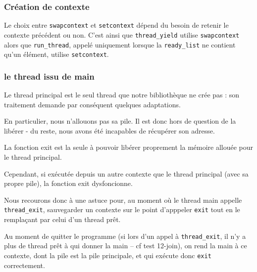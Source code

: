 \subsubsection{Création de contexte}
Le choix entre \texttt{swapcontext} et \texttt{setcontext} dépend du
 besoin de retenir le contexte précédent ou non. C'est ainsi que 
\texttt{thread\_yield} utilise \texttt{swapcontext} alors que 
\texttt{run\_thread}, appelé uniquement lorsque la \texttt{ready\_list}
ne contient qu'un élément, utilise \texttt{setcontext}. 

\subsubsection{le thread issu de main}
Le thread principal est le seul thread que notre bibliothèque ne crée
pas : son traitement demande par conséquent quelques adaptations.

En particulier, nous n'allouons pas sa pile. Il est donc hors de
question de la libérer - du reste, nous avons été incapables de
récupérer son adresse.

La fonction exit est la seule à pouvoir libérer proprement la mémoire
allouée pour le thread principal.

Cependant, si exécutée depuis un autre contexte que le thread principal
(avec sa propre pile), la fonction exit dysfoncionne.

Nous recourons donc à une astuce pour, au moment où le thread main
appelle \texttt{thread\_exit}, sauvegarder un contexte sur le point
d'apppeler \texttt{exit} tout en le remplaçant par celui d'un thread
prêt.

Au moment de quitter le programme (si lors d'un appel à
\texttt{thread_exit}, il n'y a plus de thread prêt à qui donner la
main -- cf test 12-join), on rend la main à ce contexte, dont la pile
est la pile principale, et qui exécute donc \texttt{exit} correctement.
